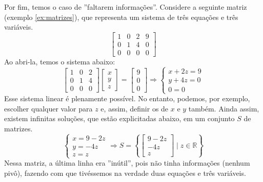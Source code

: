 \documentclass[../main.tex]{subfiles}
\begin{document}
			Por fim, temos o caso de ''faltarem informações''. Considere a seguinte matriz (exemplo \ref{ex:matrizes}), que representa um sistema de três equações e três variáveis.
			\[
			\begin{bmatrix}
				{1} & 0 & 2 & 9\\
				0 & {1} & 4 & 0\\
				0 & 0 & 0 & 0
			\end{bmatrix}
			\]
			Ao abri-la, temos o sistema abaixo:
			\[
			\begin{bmatrix}
				1 & 0 & 2\\
				0 & 1 & 4\\
				0 & 0 & 0
			\end{bmatrix}
			\begin{bmatrix}
				x \\ y \\ z
			\end{bmatrix}=
			\begin{bmatrix}
				9 \\ 0 \\ 0
			\end{bmatrix}
			\Rightarrow
			\begin{cases}
				x+2z=9\\
				y+4z=0\\
				0=0
			\end{cases}
			\]
			Esse sistema linear é plenamente possível. No entanto, podemos, por exemplo, escolher qualquer valor para $z$ e, assim, definir os de $x$ e $y$ também. Ainda assim, existem infinitas soluções, que estão explicitadas abaixo, em um conjunto $S$ de matrizes.
			\[
			\begin{cases}
				x=9-2z\\
				y=-4z\\
				z=z
			\end{cases}\Rightarrow
			S = \left\{ \begin{bmatrix}
				9 - 2z\\
				-4z \\
				z
			\end{bmatrix} \mid z \in \mathbb{R} \right\}
			\]
			Nessa matriz, a última linha era ''inútil'', pois não tinha informações (nenhum pivô), fazendo com que tivéssemos na verdade duas equações e três variáveis.
			
\end{document}
